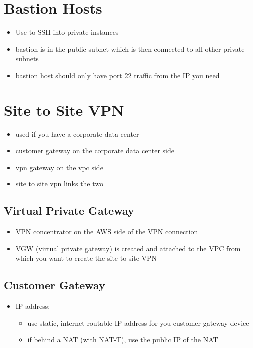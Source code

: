 \documentclass[]{scrartcl}
\begin{document}
\section{Bastion Hosts}
\begin{itemize}
	\item Use to SSH into private instances
	\item bastion is in the public subnet which is then connected to all other private subnets
	\item bastion host should only have port 22 traffic from the IP you need
\end{itemize}

\section{Site to Site VPN}
\begin{itemize}
	\item used if you have a corporate data center
	\item customer gateway on the corporate data center side
	\item vpn gateway on the vpc side
	\item site to site vpn links the two
\end{itemize}

\subsection{Virtual Private Gateway}
\begin{itemize}
	\item VPN concentrator on the AWS side of the VPN connection
	\item VGW (virtual private gateway) is created and attached to the VPC from which you want to create the site to site VPN
\end{itemize}

\subsection{Customer Gateway}
\begin{itemize}
	\item IP address:
	\begin{itemize}
		\item use static, internet-routable IP address for you customer gateway device
		\item if behind a NAT (with NAT-T), use the public IP of the NAT
	\end{itemize}
\end{itemize}
\end{document}
